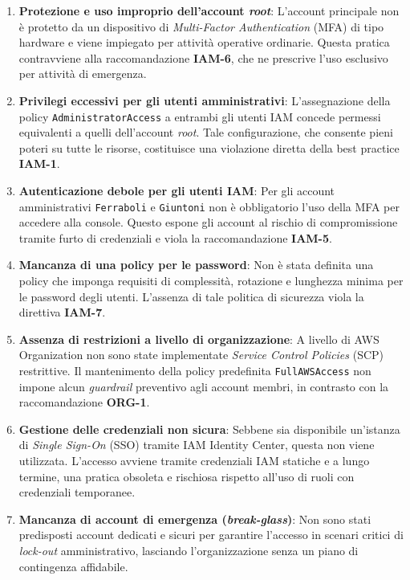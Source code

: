 \begin{enumerate}
    \item \textbf{Protezione e uso improprio dell'account \emph{root}}: L'account principale non è protetto da un dispositivo di \emph{Multi-Factor Authentication} (MFA) di tipo hardware e viene impiegato per attività operative ordinarie. Questa pratica contravviene alla raccomandazione \textbf{IAM-6}, che ne prescrive l'uso esclusivo per attività di emergenza.

    \item \textbf{Privilegi eccessivi per gli utenti amministrativi}: L'assegnazione della policy \texttt{AdministratorAccess} a entrambi gli utenti IAM concede permessi equivalenti a quelli dell'account \emph{root}. Tale configurazione, che consente pieni poteri su tutte le risorse, costituisce una violazione diretta della best practice \textbf{IAM-1}.

    \item \textbf{Autenticazione debole per gli utenti IAM}: Per gli account amministrativi \texttt{Ferraboli} e \texttt{Giuntoni} non è obbligatorio l'uso della MFA per accedere alla console. Questo espone gli account al rischio di compromissione tramite furto di credenziali e viola la raccomandazione \textbf{IAM-5}.

    \item \textbf{Mancanza di una policy per le password}: Non è stata definita una policy che imponga requisiti di complessità, rotazione e lunghezza minima per le password degli utenti. L'assenza di tale politica di sicurezza viola la direttiva \textbf{IAM-7}.
    
    \item \textbf{Assenza di restrizioni a livello di organizzazione}: A livello di AWS Organization non sono state implementate \emph{Service Control Policies} (SCP) restrittive. Il mantenimento della policy predefinita \texttt{FullAWSAccess} non impone alcun \emph{guardrail} preventivo agli account membri, in contrasto con la raccomandazione \textbf{ORG-1}.

    \item \textbf{Gestione delle credenziali non sicura}: Sebbene sia disponibile un'istanza di \emph{Single Sign-On} (SSO) tramite IAM Identity Center, questa non viene utilizzata. L'accesso avviene tramite credenziali IAM statiche e a lungo termine, una pratica obsoleta e rischiosa rispetto all'uso di ruoli con credenziali temporanee.
    
    \item \textbf{Mancanza di account di emergenza (\emph{break-glass})}: Non sono stati predisposti account dedicati e sicuri per garantire l'accesso in scenari critici di \emph{lock-out} amministrativo, lasciando l'organizzazione senza un piano di contingenza affidabile.
\end{enumerate}
